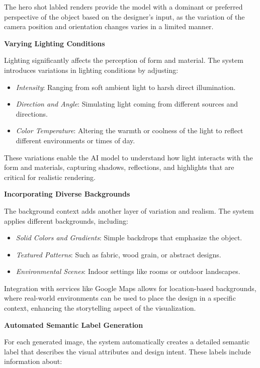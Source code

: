 \documentclass{article}
\begin{document}
The hero shot labled renders provide the model with a dominant or preferred perspective of the object based on the designer's input, as the variation of the camera position and orientation changes varies in a limited manner.

\textbf{Varying Lighting Conditions}

Lighting significantly affects the perception of form and material. The system introduces variations in lighting conditions by adjusting:

\begin{itemize}
    \item \textit{Intensity}: Ranging from soft ambient light to harsh direct illumination.
    \item \textit{Direction and Angle}: Simulating light coming from different sources and directions.
    \item \textit{Color Temperature}: Altering the warmth or coolness of the light to reflect different environments or times of day.
\end{itemize}

These variations enable the AI model to understand how light interacts with the form and materials, capturing shadows, reflections, and highlights that are critical for realistic rendering.

\textbf{Incorporating Diverse Backgrounds}

The background context adds another layer of variation and realism. The system applies different backgrounds, including:

\begin{itemize}
    \item \textit{Solid Colors and Gradients}: Simple backdrops that emphasize the object.
    \item \textit{Textured Patterns}: Such as fabric, wood grain, or abstract designs.
    \item \textit{Environmental Scenes}: Indoor settings like rooms or outdoor landscapes.
\end{itemize}

Integration with services like Google Maps allows for location-based backgrounds, where real-world environments can be used to place the design in a specific context, enhancing the storytelling aspect of the visualization.

\textbf{Automated Semantic Label Generation}

For each generated image, the system automatically creates a detailed semantic label that describes the visual attributes and design intent. These labels include information about:
\end{document}
